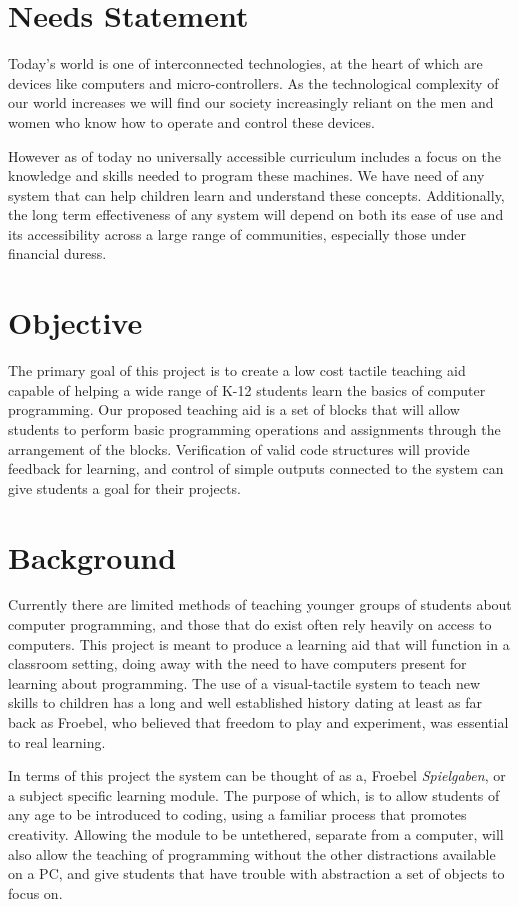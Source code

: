 \section{Needs Statement}
Today's world is one of interconnected technologies, at the heart of which are devices like computers and micro-controllers. As the technological complexity of our world increases we will find our society increasingly reliant on the men and women who know how to operate and control these devices.


However as of today no universally accessible curriculum includes a focus on the knowledge and skills needed to program these machines. We have need of any system that can help children learn and understand these concepts. Additionally,  the long term effectiveness of any system will depend on both its ease of use and its accessibility across a large range of communities, especially those under financial duress.


\section{Objective}
The primary goal of this project is to create a low cost tactile teaching aid capable of helping a wide range of K-12 students learn the basics of computer programming. Our proposed teaching aid is a set of blocks that will allow students to  perform basic programming operations and assignments through the arrangement of the blocks. Verification of valid code structures will provide feedback for learning, and control of simple outputs connected to the system can give students a goal for their projects.
\newpage


\section{Background}

Currently there are limited methods of teaching  younger groups of students about computer programming, and those that do exist often rely heavily on access to computers. This project is meant to produce a learning aid that will function in a classroom setting, doing away with the need to have computers present for learning about programming.
The use of a visual-tactile system to teach new skills to children has a long and well established history dating at least as far back as Froebel, who believed that freedom to play and experiment, was essential to real learning.

 In terms of this project the system can be thought of as a, Froebel \textit{Spielgaben}, or a subject specific learning module. The purpose of which, is to allow students of any age to be introduced to coding, using a familiar process that promotes creativity. Allowing the module to be untethered, separate from a computer, will also allow the teaching of programming without the other distractions available on a PC, and give students that have trouble with abstraction a set of objects to focus on.

